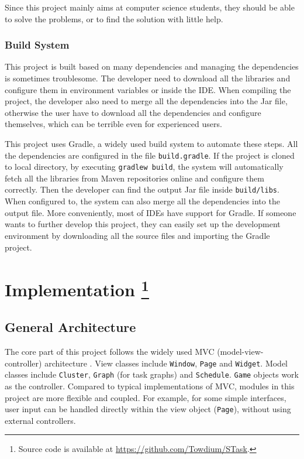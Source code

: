 \documentclass[msc,deptreport, cs]{infthesis}
\begin{document}
Since this project mainly aims at computer science students, they should be able to solve the problems, or to find the solution with little help.

\subsection{Build System}

This project is built based on many dependencies and managing the dependencies is sometimes troublesome. The developer need to download all the libraries and configure them in environment variables or inside the IDE. When compiling the project, the developer also need to merge all the dependencies into the Jar file, otherwise the user have to download all the dependencies and configure themselves, which can be terrible even for experienced users. 

This project uses Gradle, a widely used build system to automate these steps. All the dependencies are configured in the file \verb+build.gradle+. If the project is cloned to local directory, by executing \verb+gradlew build+, the system will automatically fetch all the libraries from Maven repositories online and configure them correctly. Then the developer can find the output Jar file inside \verb+build/libs+. When configured to, the system can also merge all the dependencies into the output file. More conveniently, most of IDEs have support for Gradle. If someone wants to further develop this project, they can easily set up the development environment by downloading all the source files and importing the Gradle project.

\chapter[Implementation]{Implementation \footnote{Source code is available at \url{https://github.com/Towdium/STask}.}}

\section{General Architecture} \label{sec:architecture}

The core part of this project follows the widely used MVC (model-view-controller) architecture \cite{buschmann1996patternoriented}. View classes include \verb+Window+, \verb+Page+ and \verb+Widget+. Model classes include \verb+Cluster+, \verb+Graph+ (for task graphs) and \verb+Schedule+. \verb+Game+ objects work as the controller. Compared to typical implementations of MVC, modules in this project are more flexible and coupled. For example, for some simple interfaces, user input can be handled directly within the view object (\verb+Page+), without using external controllers.
\end{document}
